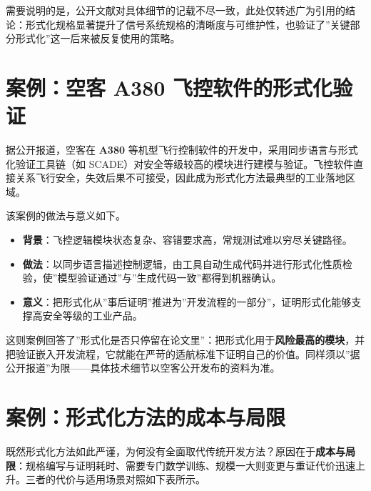 \documentclass[12pt,a4paper,twoside,openany]{ctexbook}
\numberwithin{figure}{chapter}
\numberwithin{table}{chapter}
\providecommand{\tightlist}{\setlength{\itemsep}{0pt}\setlength{\parskip}{0pt}}
\begin{document}
需要说明的是，公开文献对具体细节的记载不尽一致，此处仅转述广为引用的结论：形式化规格显著提升了信号系统规格的清晰度与可维护性，也验证了''关键部分形式化''这一后来被反复使用的策略。

\section{案例：空客 A380
飞控软件的形式化验证}\label{ux6848ux4f8bux7a7aux5ba2-a380-ux98deux63a7ux8f6fux4ef6ux7684ux5f62ux5f0fux5316ux9a8cux8bc1}

据公开报道，空客在 \textbf{A380}
等机型飞行控制软件的开发中，采用同步语言与形式化验证工具链（如
SCADE）对安全等级较高的模块进行建模与验证。飞控软件直接关系飞行安全，失效后果不可接受，因此成为形式化方法最典型的工业落地区域。

该案例的做法与意义如下。

\begin{itemize}
\tightlist
\item
  \textbf{背景}：飞控逻辑模块状态复杂、容错要求高，常规测试难以穷尽关键路径。
\item
  \textbf{做法}：以同步语言描述控制逻辑，由工具自动生成代码并进行形式化性质检验，使''模型验证通过''与''生成代码一致''都得到机器确认。
\item
  \textbf{意义}：把形式化从''事后证明''推进为''开发流程的一部分''，证明形式化能够支撑高安全等级的工业产品。
\end{itemize}

这则案例回答了''形式化是否只停留在论文里''：把形式化用于\textbf{风险最高的模块}，并把验证嵌入开发流程，它就能在严苛的适航标准下证明自己的价值。同样须以''据公开报道''为限------具体技术细节以空客公开发布的资料为准。

\section{案例：形式化方法的成本与局限}\label{ux6848ux4f8bux5f62ux5f0fux5316ux65b9ux6cd5ux7684ux6210ux672cux4e0eux5c40ux9650}

既然形式化方法如此严谨，为何没有全面取代传统开发方法？原因在于\textbf{成本与局限}：规格编写与证明耗时、需要专门数学训练、规模一大则变更与重证代价迅速上升。三者的代价与适用场景对照如下表所示。
\end{document}
